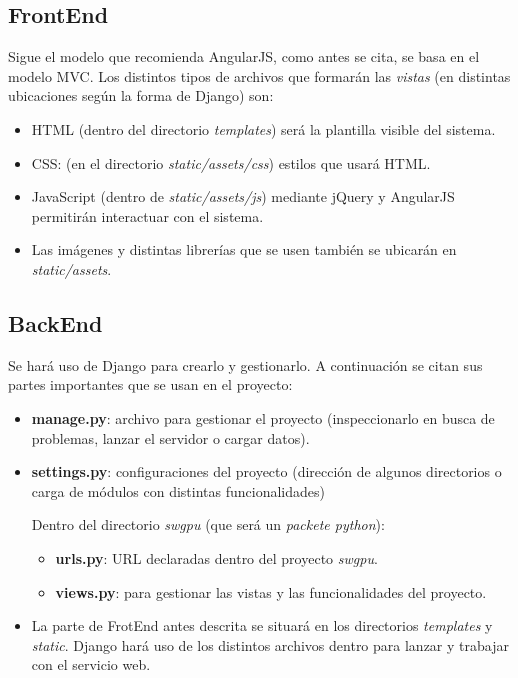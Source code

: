 \bigskip
\subsection{FrontEnd}
\bigskip

Sigue el modelo que recomienda AngularJS, como antes se cita, se basa en el modelo MVC. Los distintos tipos de archivos que formarán las \textit{vistas} (en distintas ubicaciones según la forma de Django) son:

\begin{itemize}
	\item HTML (dentro del directorio \textit{templates}) será la plantilla visible del sistema.
	\item CSS: (en el directorio \textit{static/assets/css}) estilos que usará HTML.
	\item JavaScript (dentro de \textit{static/assets/js}) mediante jQuery y AngularJS permitirán interactuar con el sistema.
	\item Las imágenes y distintas librerías que se usen también se ubicarán en \textit{static/assets}.
\end{itemize}


\bigskip
\subsection{BackEnd}
\bigskip

Se hará uso de Django para crearlo y gestionarlo. A continuación se citan sus partes importantes que se usan en el proyecto:

\begin{itemize}

	\item \textbf{manage.py}: archivo para gestionar el proyecto (inspeccionarlo en busca de problemas, lanzar el servidor o cargar datos).
	\item \textbf{settings.py}: configuraciones del proyecto (dirección de algunos directorios o carga de módulos con distintas funcionalidades)
	
	Dentro del directorio \textit{swgpu} (que será un \textit{packete python}):
	\begin{itemize}
		\item \textbf{urls.py}: URL declaradas dentro del proyecto \textit{swgpu}.
		\item \textbf{views.py}: para gestionar las vistas y las funcionalidades del proyecto.
	\end{itemize}
	
	
	\item La parte de FrotEnd antes descrita se situará en los directorios \textit{templates} y \textit{static}. Django hará uso de los distintos archivos dentro para lanzar y trabajar con el servicio web.
\end{itemize}

